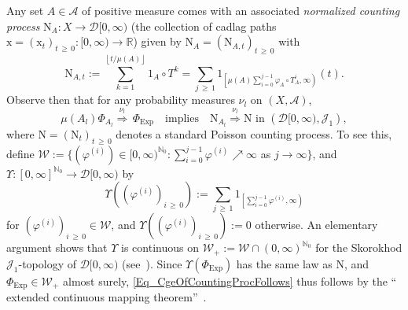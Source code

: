 \documentclass[AHL,Unicode,longabstracts]{cedram}
\newcommand{\clA}{\mathcal{A}}
\newcommand{\clD}{\mathcal{D}}
\newcommand{\clW}{\mathcal{W}}
\newcommand{\clJ}{\mathcal{J}}
\newcommand{\Expl}{\mathrm{Exp}}
\newcommand{\rmN}{\mathrm{N}}
\newcommand{\rmx}{\mathrm{x}}
\newcommand{\bbN}{\mathbb{N}}
\newcommand{\bbR}{\mathbb{R}}
\begin{document}
\begin{rema}\label{R_CgeCounting1}
Any set $A\in\clA$ of positive measure comes with an associated
\emph{normalized counting process} $\rmN_{A}:X\rightarrow\clD [0,\infty)$ (the collection of cadlag paths $\rmx=(\rmx _{t})_{t\,\geq\,0}:[0,\infty)\rightarrow\bbR$) given by $\rmN _{A}=(\rmN_{A,t})_{t\,\geq\,0}$ with
\begin{equation}\label{Eq_DefNormalizedCountingProc}
\rmN_{A,t}:= {\sum_{k=1}^{\left\lfloor t/\mu(A)\right\rfloor }} 1_{A}\circ T^{k}= {\sum_{j\,\geq\,1}} 1_{\left[\mu(A)\sum\limits_{i=0}^{j-1}\varphi_{A}\circ T_{A}^{i},\infty\right) }(t).
\end{equation}
Observe then that for any probability measures $\nu_{l}$ on $(X,\clA) $,
\begin{equation}\label{Eq_CgeOfCountingProcFollows}
\mu(A_{l})\Phi_{A_{l}}\overset{\nu_{l}}{\Longrightarrow}\,\Phi_{\Expl }\quad\text{implies}\quad\rmN_{A_{l}}\overset{\nu_{l}} {\Longrightarrow}\rmN\text{ in }\left(\clD[0,\infty),\clJ_{1}\right), 
\end{equation}
where $\rmN=(\rmN_{t})_{t\,\geq\,0}$ denotes a standard Poisson counting process. To see this, define $\clW:=\{(\varphi^{(i)})\in\lbrack0,\infty)^{\bbN_{0}}:\sum_{i=0}^{j-1}\varphi^{(i)}
\nearrow\infty$ as $j\rightarrow\infty\}$, and $\Upsilon:[0,\infty]^{\bbN_{0}}\rightarrow\clD[0,\infty)$ by 
\[
\Upsilon \left(\left(\varphi^{(i)}\right)_{i\,\geq\,0}\right):=\sum_{j\,\geq\,1}1_{\left[\sum\limits_{i=0}^{j-1}
\varphi^{(i)},\infty\right) }
\]
for $(\varphi^{(i)})_{i\,\geq\,0}\in\clW$, and $\Upsilon((\varphi^{(i)})_{i\,\geq\,0}):=0$ otherwise. An elementary argument shows that $\Upsilon$ is continuous on $\clW_{+}:=\clW
\cap(0,\infty)^{\bbN_{0}}$ for the Skorokhod $\clJ_{1}$-topology of $\clD[0,\infty)$ (see~\cite{Bi,Whitt}). Since $\Upsilon (\Phi_{\Expl})$ has the same law as $\rmN$, and $\Phi _{\Expl}\in\clW_{+}$ almost surely, \eqref{Eq_CgeOfCountingProcFollows} thus follows by the `` extended continuous mapping theorem''~\cite[Theorem~2.7]{Bi}.
\end{rema}
\end{document}
